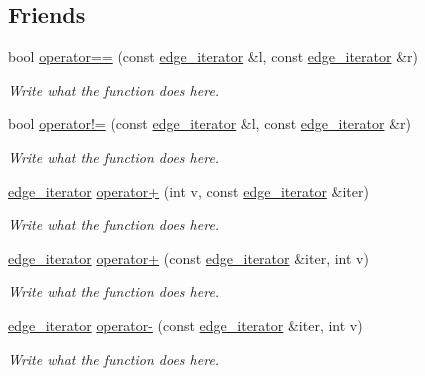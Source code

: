 \subsection*{Friends}
\begin{DoxyCompactItemize}
\item 
bool \hyperlink{classgraph_1_1edge__iterator_a28e0f640c1891ad90508ba99546ec535}{operator==} (const \hyperlink{classgraph_1_1edge__iterator}{edge\+\_\+iterator} \&l, const \hyperlink{classgraph_1_1edge__iterator}{edge\+\_\+iterator} \&r)
\begin{DoxyCompactList}\small\item\em Write what the function does here. \end{DoxyCompactList}\item 
bool \hyperlink{classgraph_1_1edge__iterator_af3cf38a5594205c4367bbc054c85a507}{operator!=} (const \hyperlink{classgraph_1_1edge__iterator}{edge\+\_\+iterator} \&l, const \hyperlink{classgraph_1_1edge__iterator}{edge\+\_\+iterator} \&r)
\begin{DoxyCompactList}\small\item\em Write what the function does here. \end{DoxyCompactList}\item 
\hyperlink{classgraph_1_1edge__iterator}{edge\+\_\+iterator} \hyperlink{classgraph_1_1edge__iterator_a4ecd4e3679483eda13d5338fd4353d88}{operator+} (int v, const \hyperlink{classgraph_1_1edge__iterator}{edge\+\_\+iterator} \&iter)
\begin{DoxyCompactList}\small\item\em Write what the function does here. \end{DoxyCompactList}\item 
\hyperlink{classgraph_1_1edge__iterator}{edge\+\_\+iterator} \hyperlink{classgraph_1_1edge__iterator_a5dd36755f0bb84f84588c62aef5e5830}{operator+} (const \hyperlink{classgraph_1_1edge__iterator}{edge\+\_\+iterator} \&iter, int v)
\begin{DoxyCompactList}\small\item\em Write what the function does here. \end{DoxyCompactList}\item 
\hyperlink{classgraph_1_1edge__iterator}{edge\+\_\+iterator} \hyperlink{classgraph_1_1edge__iterator_a98fb2143e8ba5e7a043bd4c87c09814f}{operator-\/} (const \hyperlink{classgraph_1_1edge__iterator}{edge\+\_\+iterator} \&iter, int v)
\begin{DoxyCompactList}\small\item\em Write what the function does here. \end{DoxyCompactList}\item 

\end{DoxyCompactItemize}
